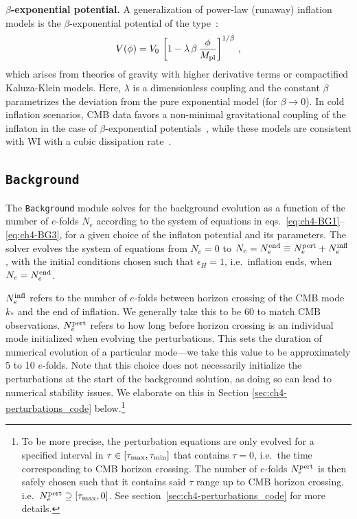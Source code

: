 {\bf $\beta$-exponential potential.} A generalization of power-law (runaway) inflation models is the $\beta$-exponential potential of the type~\cite{Alcaniz:2006nu}:
\begin{equation}
    \label{eq:ch4-betaexponential}
    V(\phi)= V_0\,\left[1-\lambda\,\beta\,\frac{\phi}{M_{\rm pl}}\right]^{1/\beta}\,,
\end{equation}
which arises from theories of gravity with higher derivative terms or compactified Kaluza-Klein models. Here, $\lambda$ is a dimensionless coupling and the constant $\beta$ parametrizes the deviation from the pure exponential model (for $\beta\to0$). In cold inflation scenarios, CMB data favors a non-minimal gravitational coupling of the inflaton in the case of $\beta$-exponential potentials~\cite{dosSantos:2021vis}, while these models are consistent with WI with a cubic dissipation rate~\cite{Santos:2022exm}.

\subsection{\texttt{Background}
\label{sec:ch4-background}}

The \texttt{Background} module solves for the background evolution as a function of the number of $e$-folds $N_e$ according to the system of equations in eqs.~\eqref{eq:ch4-BG1}--\eqref{eq:ch4-BG3}, for a given choice of the inflaton potential and its parameters. The solver evolves the system of equations from $N_e=0$ to $N_e=N^{\rm{end}}_{e}\equiv N_e^{\rm{pert}}+N_e^{\rm{infl}}$, with the initial conditions chosen such that $\epsilon_H=1$, i.e.\ inflation ends, when $N_e=N_e^{\rm{end}}$.

$N_e^{\rm{infl}}$ refers to the number of $e$-folds between horizon crossing of the CMB mode $k_*$ and the end of inflation. We generally take this to be $60$ to match CMB observations.
$N_e^{\rm{pert}}$ refers to how long before horizon crossing is an individual mode initialized when evolving the perturbations. This sets the duration of numerical evolution of a particular mode---we take this value to be approximately 5 to 10 $e$-folds. Note that this choice does not necessarily initialize the perturbations at the start of the background solution, as doing so can lead to numerical stability issues. We elaborate on this in Section \ref{sec:ch4-perturbations_code} below.\footnote{
To be more precise, the perturbation equations are only evolved for a specified interval in $\tau \in[\tau_{\rm{max}},\tau_{\rm{min}}]$ that contains $\tau=0$, i.e.\ the time corresponding to CMB horizon crossing. The number of $e$-folds $N_e^{\rm{pert}}$ is then safely chosen such that it contains said $\tau$ range up to CMB horizon crossing, i.e.\ $N^{\rm{pert}}_e \supseteq[\tau_{\rm{max}},0]$. See section~\ref{sec:ch4-perturbations_code} for more details.
}


